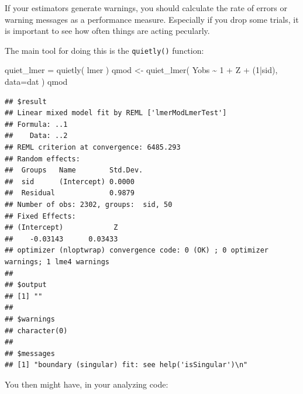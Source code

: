 \documentclass[
]{book}
\newenvironment{Shaded}{\begin{snugshade}}{\end{snugshade}}
\newcommand{\AttributeTok}[1]{\textcolor[rgb]{0.77,0.63,0.00}{#1}}
\newcommand{\DecValTok}[1]{\textcolor[rgb]{0.00,0.00,0.81}{#1}}
\newcommand{\FunctionTok}[1]{\textcolor[rgb]{0.00,0.00,0.00}{#1}}
\newcommand{\NormalTok}[1]{#1}
\newcommand{\OtherTok}[1]{\textcolor[rgb]{0.56,0.35,0.01}{#1}}
\newcommand{\SpecialCharTok}[1]{\textcolor[rgb]{0.00,0.00,0.00}{#1}}
\begin{document}
If your estimators generate warnings, you should calculate the rate of errors or warning messages as a performance measure.
Especially if you drop some trials, it is important to see how often things are acting pecularly.

The main tool for doing this is the \texttt{quietly()} function:

\begin{Shaded}
\begin{Highlighting}[]
\NormalTok{quiet\_lmer }\OtherTok{=} \FunctionTok{quietly}\NormalTok{( lmer )}
\NormalTok{qmod }\OtherTok{\textless{}{-}} \FunctionTok{quiet\_lmer}\NormalTok{( Yobs }\SpecialCharTok{\textasciitilde{}} \DecValTok{1} \SpecialCharTok{+}\NormalTok{ Z }\SpecialCharTok{+}\NormalTok{ (}\DecValTok{1}\SpecialCharTok{|}\NormalTok{sid), }\AttributeTok{data=}\NormalTok{dat )}
\NormalTok{qmod}
\end{Highlighting}
\end{Shaded}

\begin{verbatim}
## $result
## Linear mixed model fit by REML ['lmerModLmerTest']
## Formula: ..1
##    Data: ..2
## REML criterion at convergence: 6485.293
## Random effects:
##  Groups   Name        Std.Dev.
##  sid      (Intercept) 0.0000  
##  Residual             0.9879  
## Number of obs: 2302, groups:  sid, 50
## Fixed Effects:
## (Intercept)            Z  
##    -0.03143      0.03433  
## optimizer (nloptwrap) convergence code: 0 (OK) ; 0 optimizer warnings; 1 lme4 warnings 
## 
## $output
## [1] ""
## 
## $warnings
## character(0)
## 
## $messages
## [1] "boundary (singular) fit: see help('isSingular')\n"
\end{verbatim}

You then might have, in your analyzing code:
\end{document}
